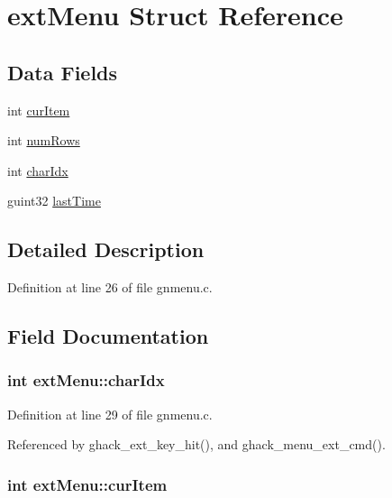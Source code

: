 \hypertarget{structextMenu}{\section{ext\+Menu Struct Reference}
\label{structextMenu}
}
\subsection*{Data Fields}
\begin{DoxyCompactItemize}
\item 
int \hyperlink{structextMenu_aaa686aca39f89627044b163edf1db00e}{cur\+Item}
\item 
int \hyperlink{structextMenu_ac90ebf8746d53b094060b505a0c4dc4b}{num\+Rows}
\item 
int \hyperlink{structextMenu_a56587827e174f902da38f5569e8b9c25}{char\+Idx}
\item 
guint32 \hyperlink{structextMenu_a66b8a9fd7a18cf439b0a82d0712d540c}{last\+Time}
\end{DoxyCompactItemize}


\subsection{Detailed Description}


Definition at line 26 of file gnmenu.\+c.



\subsection{Field Documentation}
\hypertarget{structextMenu_a56587827e174f902da38f5569e8b9c25}{
\subsubsection[{char\+Idx}]{\setlength{\rightskip}{0pt plus 5cm}int ext\+Menu\+::char\+Idx}}\label{structextMenu_a56587827e174f902da38f5569e8b9c25}


Definition at line 29 of file gnmenu.\+c.



Referenced by ghack\+\_\+ext\+\_\+key\+\_\+hit(), and ghack\+\_\+menu\+\_\+ext\+\_\+cmd().

\hypertarget{structextMenu_aaa686aca39f89627044b163edf1db00e}{
\subsubsection[{cur\+Item}]{\setlength{\rightskip}{0pt plus 5cm}int ext\+Menu\+::cur\+Item}}\label{structextMenu_aaa686aca39f89627044b163edf1db00e}


